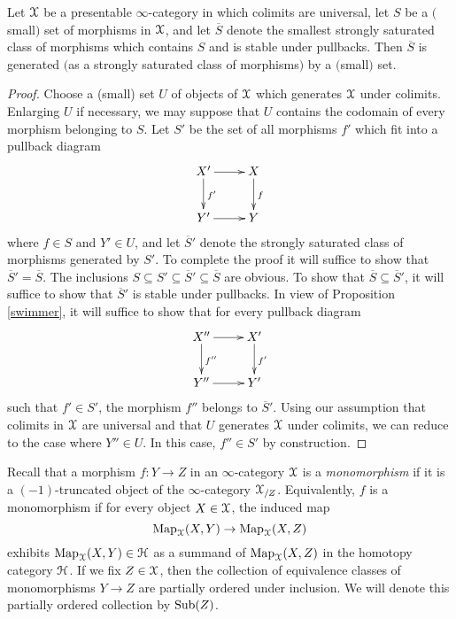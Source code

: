 \begin{corollary}\label{sweetums}
Let $\operatorname{\mathcal{X}}$ be a presentable $\infty$-category in which colimits are universal, let $S$ be a $($small$)$ set of morphisms in $\operatorname{\mathcal{X}}$, and let $\overline{S}$ denote the smallest strongly saturated class of morphisms which contains $S$ and is stable under pullbacks. Then $\overline{S}$ is generated $($as a strongly saturated class of morphisms$)$ by a $($small$)$ set.
\end{corollary}

\begin{proof}
Choose a (small) set $U$ of objects of $\operatorname{\mathcal{X}}$ which generates $\operatorname{\mathcal{X}}$ under colimits. Enlarging $U$ if necessary, we may suppose that $U$ contains the codomain of every morphism belonging to $S$.
Let $S'$ be the set of all morphisms $f'$ which fit into a pullback diagram
$$ \xymatrix{ X' \ar[r] \ar[d]^{f'} & X \ar[d]^{f} \\
Y' \ar[r] & Y }$$
where $f \in S$ and $Y' \in U$, and let $\overline{S}'$ denote the strongly saturated class of morphisms generated by $S'$. To complete the proof it will suffice to show that $\overline{S}' = \overline{S}$.
The inclusions $S \subseteq S' \subseteq \overline{S}' \subseteq \overline{S}$ are obvious.
To show that $\overline{S} \subseteq \overline{S}'$, it will suffice to show that $\overline{S}'$ is stable under pullbacks. In view of Proposition \ref{swimmer}, it will suffice to show that for every pullback diagram
$$ \xymatrix{ X'' \ar[r] \ar[d]^{f''} & X' \ar[d]^{f'} \\
Y'' \ar[r] & Y' }$$
such that $f' \in S'$, the morphism $f''$ belongs to $\overline{S}'$. Using our assumption that colimits in $\operatorname{\mathcal{X}}$ are universal and that $U$ generates $\operatorname{\mathcal{X}}$ under colimits, we can reduce to the case where
$Y'' \in U$. In this case, $f'' \in S'$ by construction.
\end{proof}

Recall that a morphism $f: Y \rightarrow Z$ in an $\infty$-category $\operatorname{\mathcal{X}}$ is a {\it monomorphism}
if it is a $(-1)$-truncated object of the $\infty$-category $\operatorname{\mathcal{X}}_{/Z}$. Equivalently, $f$ is a monomorphism if for every object $X \in \operatorname{\mathcal{X}}$, the induced map
$$ \operatorname{{Map}}_{\operatorname{\mathcal{X}}}(X,Y) \rightarrow \operatorname{{Map}}_{\operatorname{\mathcal{X}}}(X,Z)$$
exhibits $\operatorname{{Map}}_{\operatorname{\mathcal{X}}}(X,Y) \in \operatorname{\mathcal{H}}$ as a summand of $\operatorname{{Map}}_{\operatorname{\mathcal{X}}}(X,Z)$ in the homotopy category $\operatorname{\mathcal{H}}$. If we fix $Z \in \operatorname{\mathcal{X}}$, then the collection of equivalence classes of monomorphisms $Y \rightarrow Z$ are partially ordered under inclusion. We will denote this partially ordered collection by $\operatorname{Sub}(Z)$.

